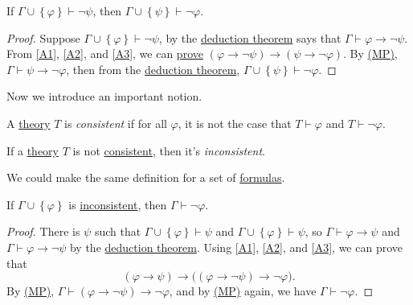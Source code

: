 \begin{proposition}[Contraposition]\label{prop:contraposition}
	If \(\Gamma \cup \left\{ \varphi  \right\} \vdash \lnot \psi \), then \(\Gamma \cup \left\{ \psi  \right\} \vdash \lnot \varphi \).
\end{proposition}
\begin{proof}
	Suppose \(\Gamma \cup \left\{ \varphi  \right\} \vdash \lnot \psi \), by the \hyperref[thm:deduction]{deduction theorem} says that \(\Gamma \vdash \varphi \to \lnot \psi\). From \autoref{A1}, \autoref{A2}, and \autoref{A3}, we can \hyperref[def:proof]{prove} \((\varphi \to \lnot \psi ) \to (\psi \to \lnot \varphi )\). By \hyperref[def:rule-of-inference]{(MP)}, \(\Gamma \vdash \psi \to \lnot \varphi \), then from the \hyperref[thm:deduction]{deduction theorem}, \(\Gamma \cup \left\{ \psi  \right\} \vdash \lnot \varphi \).
\end{proof}

Now we introduce an important notion.

\begin{definition}[Consistent]\label{def:consistent}
	A \hyperref[def:theory]{theory} \(T\) is \emph{consistent} if for all \(\varphi \), it is not the case that \(T \vdash \varphi \) and \(T \vdash \lnot \varphi \).
\end{definition}

\begin{definition}[Inconsistent]\label{def:inconsistent}
	If a \hyperref[def:theory]{theory} \(T\) is not \hyperref[def:consistent]{consistent}, then it's \emph{inconsistent}.
\end{definition}

We could make the same definition for a set of \hyperref[def:formula]{formulas}.

\begin{proposition}\label{prop:proof-by-contradiction}
	If \(\Gamma \cup \left\{ \varphi \right\}\) is \hyperref[def:inconsistent]{inconsistent}, then \(\Gamma \vdash \lnot \varphi \).
\end{proposition}
\begin{proof}
	There is \(\psi \) 	such that \(\Gamma \cup \left\{ \varphi  \right\} \vdash \psi \) and \(\Gamma \cup \left\{ \varphi  \right\} \vdash \psi \), so \(\Gamma \vdash \varphi \to \psi \) and \(\Gamma \vdash \varphi \to \lnot \psi \) by the \hyperref[thm:deduction]{deduction theorem}. Using \autoref{A1}, \autoref{A2}, and \autoref{A3}, we can prove that
	\[
		(\varphi \to \psi ) \to \big( (\varphi \to \lnot \psi ) \to \lnot \varphi \big).
	\]
	By \hyperref[def:rule-of-inference]{(MP)}, \(\Gamma \vdash (\varphi \to \lnot \psi ) \to \lnot \varphi \), and by \hyperref[def:rule-of-inference]{(MP)} again, we have \(\Gamma \vdash \lnot \varphi \).
\end{proof}

